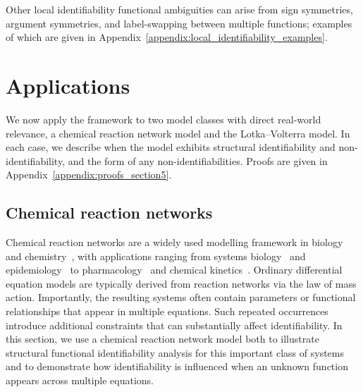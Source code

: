 \documentclass{article}
\theoremstyle{plain}
\theoremstyle{definition}
\begin{document}
{Other local identifiability functional ambiguities can arise from sign symmetries, argument symmetries, and label-swapping between multiple functions; examples of which are given in Appendix~\ref{appendix:local_identifiability_examples}.


\section{Applications} \label{sec:applications}

We now apply the framework to two model classes with direct real-world relevance, a chemical reaction network model and the Lotka--Volterra model. In each case, we describe when the model exhibits structural identifiability and non-identifiability, and the form of any non-identifiabilities. Proofs are given in Appendix~\ref{appendix:proofs_section5}.


\subsection{Chemical reaction networks} \label{sec:applications_chemical reaction network}

Chemical reaction networks are a widely used modelling framework in biology and chemistry~\cite{hahl_comparison_2016,feinberg_foundations_2019}, with applications ranging from systems biology~\cite{goodwin_oscillatory_1965} and epidemiology~\cite{avram_advancing_2024} to pharmacology~\cite{zou_application_2020} and chemical kinetics~\cite{field_oscillations_1974,warnatz_combustion_1999}. Ordinary differential equation models are typically derived from reaction networks via the law of mass action. Importantly, the resulting systems often contain parameters or functional relationships that appear in multiple equations. Such repeated occurrences introduce additional constraints that can substantially affect identifiability. In this section, we use a chemical reaction network model both to illustrate structural functional identifiability analysis for this important class of systems and to demonstrate how identifiability is influenced when an unknown function appears across multiple equations.

}
\end{document}
